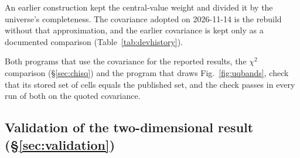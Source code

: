An earlier construction kept the central-value weight and divided it by the universe's completeness. The covariance adopted on 2026-11-14 is the rebuild without that approximation, and the earlier covariance is kept only as a documented comparison (Table~\ref{tab:devhistory}).

Both programs that use the covariance for the reported results, the $\chi^{2}$ comparison (\S\ref{sec:chisq}) and the program that draws Fig.~\ref{fig:uqbands}, check that its stored set of cells equals the published set, and the check passes in every run of both on the quoted covariance.


\subsection{Validation of the two-dimensional result (\S\ref{sec:validation})}
\label{app:devhistory-validation}


